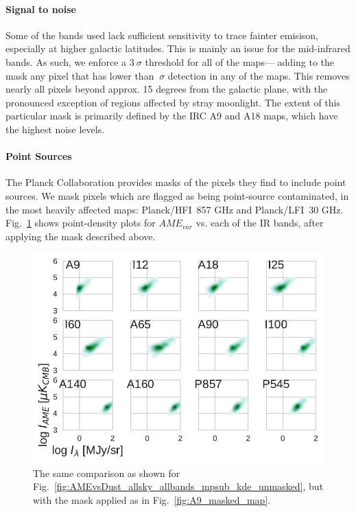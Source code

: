        \paragraph{Signal to noise}
          Some of the bands used lack sufficient sensitivity to trace fainter emisison, especially at higher galactic latitudes. This is mainly an issue for the mid-infrared bands. As such, we enforce a $3~\sigma$ threshold for all of the maps--- adding to the mask any pixel that has lower than $~\sigma$ detection in any of the maps. This removes nearly all pixels beyond approx. 15 degrees from the galactic plane, with the pronounced exception of regions affected by stray moonlight. The extent of this particular mask is primarily defined by the IRC A9 and A18 maps, which have the highest noise levels.

       \paragraph{Point Sources}
         The Planck Collaboration provides masks of the pixels they find to include point sources. We mask pixels which are flagged as being point-source contaminated, in the most heavily affected maps: Planck/HFI~857 GHz and Planck/LFI~30 GHz.
           Fig.~\ref{fig:AMEvsDust_allsky_allbands_mpsub_kde_masked} shows point-density plots for $AME_{var}$ vs. each of the IR bands, after applying the mask described above.
              \begin{figure}
                \includegraphics[width=\textwidth]{../Plots/ch_allsky/AMEvsDust_allsky_allbands_mpsub_kde_masked.pdf}
                \centering
                \caption{The same comparison as shown for Fig.~\ref{fig:AMEvsDust_allsky_allbands_mpsub_kde_unmasked}, but with the mask applied as in Fig.~\ref{fig:A9_masked_map}.}
                \label{fig:AMEvsDust_allsky_allbands_mpsub_kde_masked}
              \end{figure}
